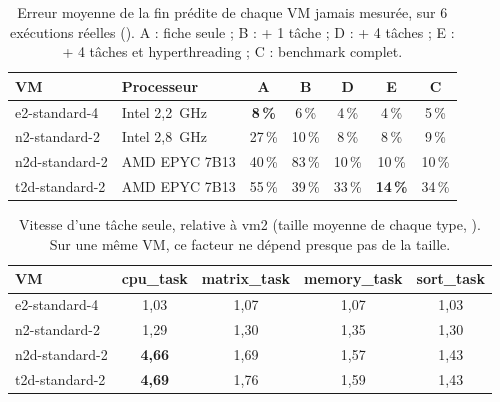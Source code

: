 \begin{table}[H]
\centering\small
\begin{tabular}{llccccc}
\toprule
\textbf{VM} & \textbf{Processeur} & \textbf{A} & \textbf{B} & \textbf{D} & \textbf{E} & \textbf{C} \\
\midrule
e2-standard-4  & Intel 2,2~GHz  & \textbf{8\,\%}  & 6\,\%  & 4\,\%  & 4\,\%  & 5\,\%  \\
n2-standard-2  & Intel 2,8~GHz  & 27\,\% & 10\,\% & 8\,\%  & 8\,\%  & 9\,\%  \\
n2d-standard-2 & AMD EPYC 7B13  & 40\,\% & 83\,\% & 10\,\% & 10\,\% & 10\,\% \\
t2d-standard-2 & AMD EPYC 7B13  & 55\,\% & 39\,\% & 33\,\% & \textbf{14\,\%} & 34\,\% \\
\bottomrule
\end{tabular}
\caption{Erreur moyenne de la fin prédite de chaque VM jamais mesurée, sur
6 exécutions réelles (\mesure{}). A : fiche seule ; B : + 1 tâche ; D : + 4 tâches ;
E : + 4 tâches et hyperthreading ; C : benchmark complet.}
\label{tab:generalisation}
\end{table}

\begin{table}[H]
\centering\small
\begin{tabular}{lcccc}
\toprule
\textbf{VM} & \textbf{cpu\_task} & \textbf{matrix\_task} & \textbf{memory\_task} & \textbf{sort\_task} \\
\midrule
e2-standard-4  & 1,03 & 1,07 & 1,07 & 1,03 \\
n2-standard-2  & 1,29 & 1,30 & 1,35 & 1,30 \\
n2d-standard-2 & \textbf{4,66} & 1,69 & 1,57 & 1,43 \\
t2d-standard-2 & \textbf{4,69} & 1,76 & 1,59 & 1,43 \\
\bottomrule
\end{tabular}
\caption{Vitesse d'une tâche seule, relative à vm2 (taille moyenne de chaque
type, \mesure{}). Sur une même VM, ce facteur ne dépend presque pas de la taille.}
\label{tab:vitesse_type}
\end{table}

